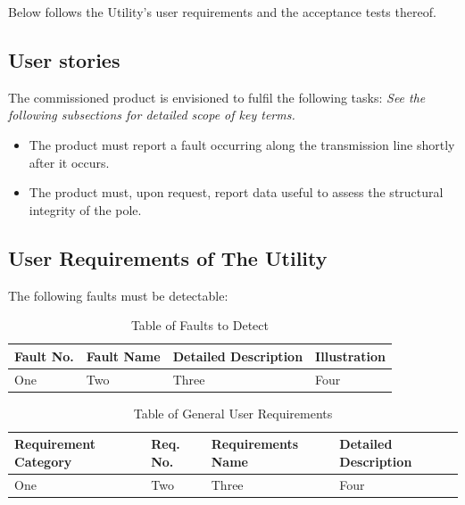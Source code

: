 \documentclass[12pt]{article}
\begin{document}
Below follows the Utility's user requirements and the acceptance tests thereof.

\subsection{User stories}
The commissioned product is envisioned to fulfil the following tasks:\newline
\emph{See the following subsections for detailed scope of key terms.}
\begin{itemize}
  \item The product must report a fault occurring along the transmission line shortly after it occurs.
  \item The product must, upon request, report data useful to assess the structural integrity of the pole.
\end{itemize}

\subsection{User Requirements of The Utility}
The following faults must be detectable:

\begin{center}
  \begin{table}[htp!]
    \caption{Table of Faults to Detect}
    
    \hskip-2.2cm\begin{tabular}{|p{2cm}|p{4cm}|p{8cm}|p{4cm}|}
        \hline
        \textbf{Fault No.} & \textbf{Fault Name} & \textbf{Detailed Description} & \textbf{Illustration} \\
        \hline
        One & Two & Three & Four \\
        \hline
  
    \end{tabular}    
  
  \label{tab:faults}
  \end{table}
\end{center}

\begin{center}
  \begin{table}[htp!]
    \caption{Table of General User Requirements}
    
    \hskip-2.2cm\begin{tabular}{|p{3cm}|p{2cm}|p{4cm}|p{9cm}|}
        \hline
        \textbf{Requirement Category} & \textbf{Req. No.} & \textbf{Requirements Name} & \textbf{Detailed Description} \\
        \hline
        One & Two & Three & Four \\
        \hline
  
    \end{tabular}    
  
  \label{tab:faults}
  \end{table}
\end{center}
\end{document}
